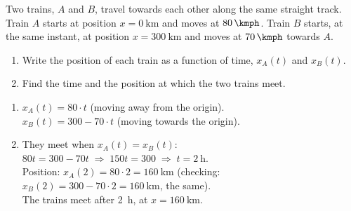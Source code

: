 \begin{exercise}
    Two trains, \(A\) and \(B\), travel towards each other along the same straight track. Train \(A\) starts at position \(x=\qty{0}{\km}\) and moves at \(\qty{80}{\kmph}\). Train \(B\) starts, at the same instant, at position \(x=\qty{300}{\km}\) and moves at \(\qty{70}{\kmph}\) towards \(A\).
    \begin{enumerate}[label=\letraminuscula]
        \item Write the position of each train as a function of time, \(x_A(t)\) and \(x_B(t)\).
        \item Find the time and the position at which the two trains meet.
    \end{enumerate}
    \begin{solu}
        \begin{enumerate}[label=\alph*)]
            \item \(x_A(t) = 80 \cdot t\) (moving away from the origin). \\
            \(x_B(t) = 300 - 70 \cdot t\) (moving towards the origin).
            \item They meet when \(x_A(t) = x_B(t)\): \(80t = 300 - 70t \;\Rightarrow\; 150t = 300 \;\Rightarrow\; t = \qty{2}{\hour}\). \\
            Position: \(x_A(2) = 80 \cdot 2 = \qty{160}{\km}\) (checking: \(x_B(2) = 300 - 70\cdot 2 = \qty{160}{\km}\), the same). \\
            The trains meet after \qty{2}{\hour}, at \(x = \qty{160}{\km}\).
        \end{enumerate}
    \end{solu}
\end{exercise}


